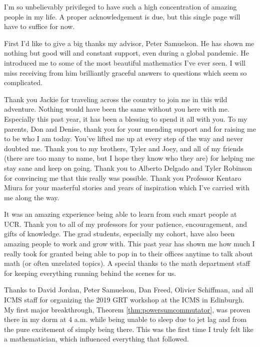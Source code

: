 \begin{acknowledgements}

I'm so unbelievably privileged to have such a high concentration of amazing people in my life. A proper acknowledgement is due, but this single page will have to suffice for now.

First I'd like to give a big thanks my advisor, Peter Samuelson. He has shown me nothing but good will and constant support, even during a global pandemic. He introduced me to some of the most beautiful mathematics I've ever seen. I will miss receiving from him brilliantly graceful answers to questions which seem so complicated. 

Thank you Jackie for traveling across the country to join me in this wild adventure. Nothing would have been the same without you here with me. Especially this past year, it has been a blessing to spend it all with you. To my parents, Don and Denise, thank you for your unending support and for raising me to be who I am today. You've lifted me up at every step of the way and never doubted me. Thank you to my brothers, Tyler and Joey, and all of my friends (there are too many to name, but I hope they know who they are) for helping me stay sane and keep on going. Thank you to Alberto Delgado and Tyler Robinson for convincing me that this really was possible. Thank you Professor Kentaro Miura for your masterful stories and years of inspiration which I've carried with me along the way.

It was an amazing experience being able to learn from such smart people at UCR. Thank you to all of my professors for your patience, encouragement, and gifts of knowledge. The grad students, especially my cohort, have also been amazing people to work and grow with. This past year has shown me how much I really took for granted being able to pop in to their offices anytime to talk about math (or often unrelated topics). A special thanks to the math department staff for keeping everything running behind the scenes for us.

Thanks to David Jordan, Peter Samuelson, Dan Freed, Olivier Schiffman, and all ICMS staff for organizing the 2019 GRT workshop at the ICMS in Edinburgh. My first major breakthrough, Theorem \ref{thm:powersumcommutator}, was proven there in my dorm at 4 a.m. while being unable to sleep due to jet lag and from the pure excitement of simply being there. This was the first time I truly felt like a mathematician, which influenced everything that followed.
\end{acknowledgements}